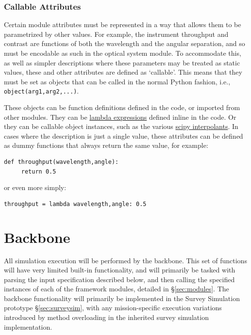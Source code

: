 \documentclass[cleanfoot]{asme2ej}
\begin{document}
\subsubsection{Callable Attributes}
Certain module attributes must be represented in a way that allows them to be parametrized by other values.  For example, the instrument throughput and contrast are functions of both the wavelength and the angular separation, and so must be encodable as such in the optical system module.  To accommodate this, as well as simpler descriptions where these parameters may be treated as static values, these and other attributes are defined as `callable'.  This means that they must be set as objects that can be called in the normal Python fashion, i.e., \verb+object(arg1,arg2,...)+.  

These objects can be function definitions defined in the code, or imported from other modules.  They can be \href{https://docs.python.org/2/reference/expressions.html#lambda}{lambda expressions} defined inline in the code.  Or they can be callable object instances, such as the various \href{http://docs.scipy.org/doc/scipy/reference/interpolate.html}{scipy interpolants}.  In cases where the description is just a single value, these attributes can be defined as dummy functions that always return the same value, for example:
\begin{verbatim}
def throughput(wavelength,angle):
     return 0.5
\end{verbatim}
or even more simply:
\begin{verbatim}
throughput = lambda wavelength,angle: 0.5
\end{verbatim}

\section{Backbone}
All simulation execution will be performed by the backbone.  This set of functions will have very limited built-in functionality, and will primarily be tasked with parsing the input specification described below, and then calling the specified instances of each of the framework modules, detailed in \S\ref{sec:modules}.  The backbone functionality will primarily be implemented in the Survey Simulation prototype \S\ref{sec:surveysim}, with any mission-specific execution variations introduced by method overloading in the inherited survey simulation implementation.
\end{document}
